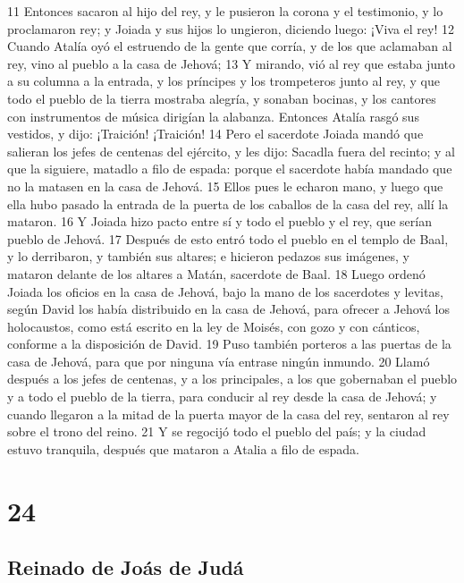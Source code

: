 11 Entonces sacaron al hijo del rey, y le pusieron la corona y el testimonio, y lo proclamaron rey; y Joiada y sus hijos lo ungieron, diciendo luego: ¡Viva el rey!
12 Cuando Atalía oyó el estruendo de la gente que corría, y de los que aclamaban al rey, vino al pueblo a la casa de Jehová;
13 Y mirando, vió al rey que estaba junto a su columna a la entrada, y los príncipes y los trompeteros junto al rey, y que todo el pueblo de la tierra mostraba alegría, y sonaban bocinas, y los cantores con instrumentos de música dirigían la alabanza. Entonces Atalía rasgó sus vestidos, y dijo: ¡Traición! ¡Traición!
14 Pero el sacerdote Joiada mandó que salieran los jefes de centenas del ejército, y les dijo: Sacadla fuera del recinto; y al que la siguiere, matadlo a filo de espada: porque el sacerdote había mandado que no la matasen en la casa de Jehová.
15 Ellos pues le echaron mano, y luego que ella hubo pasado la entrada de la puerta de los caballos de la casa del rey, allí la mataron.
16 Y Joiada hizo pacto entre sí y todo el pueblo y el rey, que serían pueblo de Jehová.
17 Después de esto entró todo el pueblo en el templo de Baal, y lo derribaron, y también sus altares; e hicieron pedazos sus imágenes, y mataron delante de los altares a Matán, sacerdote de Baal.
18 Luego ordenó Joiada los oficios en la casa de Jehová, bajo la mano de los sacerdotes y levitas, según David los había distribuido en la casa de Jehová, para ofrecer a Jehová los holocaustos, como está escrito en la ley de Moisés, con gozo y con cánticos, conforme a la disposición de David.
19 Puso también porteros a las puertas de la casa de Jehová, para que por ninguna vía entrase ningún inmundo.
20 Llamó después a los jefes de centenas, y a los principales, a los que gobernaban el pueblo y a todo el pueblo de la tierra, para conducir al rey desde la casa de Jehová; y cuando llegaron a la mitad de la puerta mayor de la casa del rey, sentaron al rey sobre el trono del reino.
21 Y se regocijó todo el pueblo del país; y la ciudad estuvo tranquila, después que mataron a Atalia a filo de espada.

\chapter{24}

\section*{Reinado de Joás de Judá}

 

